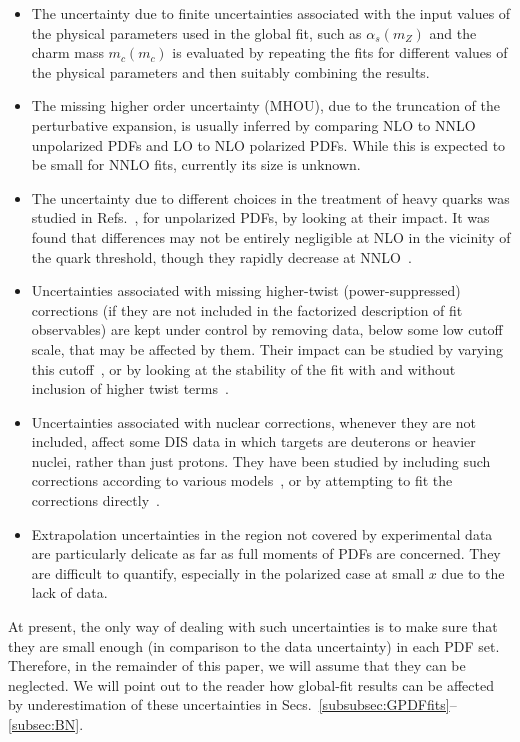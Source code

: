 \begin{itemize}

\item The uncertainty due to finite uncertainties 
associated with the input values of the physical parameters used in the global 
fit, such as $\alpha_s(m_Z)$ and the charm mass $m_c(m_c)$ is 
evaluated by repeating the fits for different values of the physical 
parameters and then suitably combining the results.

\item The missing higher order uncertainty (MHOU), due to the truncation
of the perturbative expansion, is usually inferred by comparing NLO to NNLO 
unpolarized PDFs and LO to NLO polarized PDFs.
%
While this is expected to be small for NNLO fits, currently its size is unknown.

\item The uncertainty due to different choices in the treatment of heavy quarks
was studied in Refs.~\cite{Binoth:2010nha,Thorne:2012az}, for unpolarized PDFs, 
by looking at their impact.
%
It was found that differences may not be entirely negligible at NLO in 
the vicinity of the quark threshold, though they rapidly decrease at 
NNLO~\cite{Binoth:2010nha}.

\item Uncertainties associated with missing higher-twist (power-suppressed) 
corrections (if they are not included in the factorized description of 
fit observables) are kept under control by removing data, below some low cutoff 
scale, that may be affected by them. 
%
Their impact can be studied by varying this cutoff~\cite{Martin:2003sk}, or
by looking at the stability of the fit with and without inclusion of higher 
twist terms~\cite{Sato:2016tuz,Accardi:2016qay,Alekhin:2017kpj}.

\item Uncertainties associated with nuclear corrections, whenever they are
not included, affect some DIS data in which targets are deuterons or heavier 
nuclei, rather than just protons.
%
They have been studied by including such corrections according to various 
models~\cite{Martin:2009iq,Ball:2009mk,Sato:2016tuz,Accardi:2016qay}, 
or by attempting to fit the corrections 
directly~\cite{Martin:2009iq,Martin:2012da}.

\item Extrapolation uncertainties in the region not covered 
by experimental data are particularly delicate as far as full moments of PDFs
are concerned.
%
They are difficult to quantify, especially in the polarized case at small $x$
due to the lack of data.

\end{itemize}
%
At present, the only way of dealing with such uncertainties is to make sure 
that they are small enough (in comparison to the data uncertainty)
in each PDF set.
%
Therefore, in the remainder of this paper, 
we will assume that they can be neglected.
%
We will point out to the reader how global-fit results can be affected 
by underestimation of these uncertainties in 
Secs.~\ref{subsubsec:GPDFfits}--\ref{subsec:BN}.

